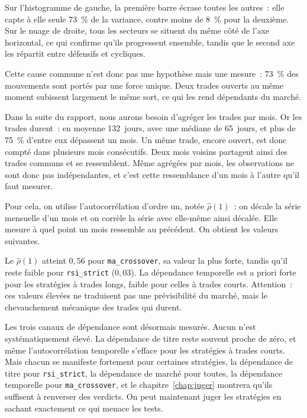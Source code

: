 
Sur l'histogramme de gauche, la première barre écrase toutes les
autres~: elle capte à elle seule 73~\% de la variance, contre moins de
8~\% pour la deuxième. Sur le nuage de droite, tous les secteurs se
situent du même côté de l'axe horizontal, ce qui confirme qu'ils
progressent ensemble, tandis que le second axe les répartit entre
défensifs et cycliques.

Cette cause commune n'est donc pas une hypothèse mais une mesure~: 73~\%
des mouvements sont portés par une force unique. Deux trades ouverts au
même moment subissent largement le même sort, ce qui les rend dépendants
du marché.


Dans la suite du rapport, nous aurons besoin d'agréger les trades par
mois. Or les trades durent~: en moyenne 132~jours, avec une médiane de
65~jours, et plus de 75~\% d'entre eux dépassent un mois. Un même trade,
encore ouvert, est donc compté dans plusieurs mois consécutifs. Deux
mois voisins partagent ainsi des trades communs et se ressemblent. Même
agrégées par mois, les observations ne sont donc pas indépendantes, et
c'est cette ressemblance d'un mois à l'autre qu'il faut mesurer.

Pour cela, on utilise l'autocorrélation d'ordre un, notée
$\hat\rho(1)$~: on décale la série mensuelle d'un mois et on corrèle la
série avec elle-même ainsi décalée. Elle mesure à quel point un mois
ressemble au précédent. On obtient les valeurs suivantes.


Le $\hat\rho(1)$ atteint $0{,}56$ pour \texttt{ma\_crossover}, sa valeur
la plus forte, tandis qu'il reste faible pour \texttt{rsi\_strict}
($0{,}03$). La dépendance temporelle est a priori forte pour les
stratégies à trades longs, faible pour celles à trades courts.
Attention~: ces valeurs élevées ne traduisent pas une prévisibilité du
marché, mais le chevauchement mécanique des trades qui durent.


Les trois canaux de dépendance sont désormais mesurés. Aucun n'est
systématiquement élevé. La dépendance de titre reste souvent proche de
zéro, et même l'autocorrélation temporelle s'efface pour les stratégies
à trades courts. Mais chacun se manifeste fortement pour certaines
stratégies, la dépendance de titre pour \texttt{rsi\_strict}, la
dépendance de marché pour toutes, la dépendance temporelle pour
\texttt{ma\_crossover}, et le chapitre~\ref{chap:juger} montrera qu'ils
suffisent à renverser des verdicts. On peut maintenant juger les
stratégies en sachant exactement ce qui menace les tests.


